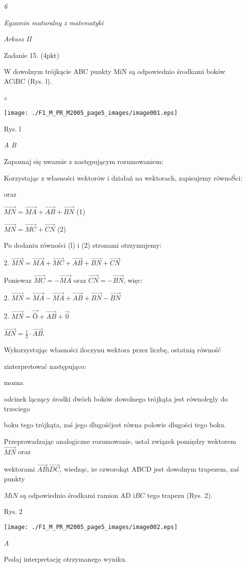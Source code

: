 \documentclass[a4paper,12pt]{article}
\begin{document}
{\it 6}

{\it Egzamin maturalny z matematyki}

{\it Arkusz II}

Zadanie 15. (4pkt)

W dowolnym trójkącie ABC punkty MiN są odpowiednio środkami boków ACiBC (Rys. l).

{\it c}
\begin{center}
\texttt{[image: ./F1\_M\_PR\_M2005\_page5\_images/image001.eps]}
\end{center}
Rys. l

{\it A  B}

Zapoznaj się uwaznie z następującym rozumowaniem:

Korzystając z własności wektorów i działań na wektorach, zapisujemy równoŚci:

oraz

$\vec{MN}=\vec{MA}+\vec{AB}+\vec{BN}$ (1)

$\vec{MN}=\vec{MC}+\vec{CN}$ (2)

Po dodaniu równości (l) $\mathrm{i}$ (2) stronami otrzymujemy:

2. $\vec{MN}=\vec{MA}+\vec{MC}+\vec{AB}+\vec{BN}+\vec{CN}$

Poniewaz $\vec{MC}=-\vec{MA}$ oraz $\vec{CN}=-\vec{BN}$, więc:

2. $\vec{MN}=\vec{MA}-\vec{MA}+\vec{AB}+\vec{BN}-\vec{BN}$

2. $\vec{MN}=\vec{\text{Õ}}+\vec{AB}+\vec{0}$

$\displaystyle \vec{MN}=\frac{1}{2}\cdot\vec{AB}.$

Wykorzystując własności iloczynu wektora przez liczbę, ostatnią równość

zinterpretować następująco:

mozna

odcinek lączący środki dwóch boków dowolnego trójkąta jest równolegly do trzeciego

boku tego trójkąta, zaś jego dlugośćjest równa polowie dlugości tego boku.

Przeprowadzając analogiczne rozumowanie, ustal związek pomiędzy wektorem $\vec{MN}$ oraz

wektorami $\vec{AB} \mathrm{i} \vec{DC}$, wiedząc, $\dot{\mathrm{z}}\mathrm{e}$ czworokąt ABCD jest dowolnym trapezem, zaś punkty

$M\mathrm{i}N$ są odpowiednio środkami ramion AD $\mathrm{i}BC$ tego trapezu (Rys. 2).

Rys. 2
\begin{center}
\texttt{[image: ./F1\_M\_PR\_M2005\_page5\_images/image002.eps]}
\end{center}
{\it A}

Podaj interpretację otrzymanego wyniku.
\end{document}
